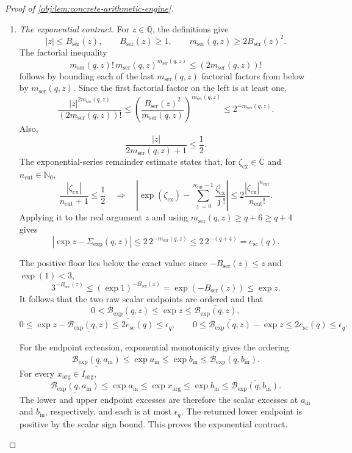 \begin{proof}[Proof of \cref{obj:lem:concrete-arithmetic-engine}]
\begin{enumerate}
\item \emph{The exponential contract.}
For \(z\in\mathbb Q\), the definitions give
\[
|z|\le B_{\mathrm{ser}}(z),\qquad
B_{\mathrm{ser}}(z)\ge1,\qquad
m_{\mathrm{ser}}(q,z)\ge2B_{\mathrm{ser}}(z)^2.
\]
The factorial inequality
\[
m_{\mathrm{ser}}(q,z)!\,
m_{\mathrm{ser}}(q,z)^{m_{\mathrm{ser}}(q,z)}
 \le(2m_{\mathrm{ser}}(q,z))!
\]
follows by bounding each of the last
\(m_{\mathrm{ser}}(q,z)\) factorial factors from below by
\(m_{\mathrm{ser}}(q,z)\). Since the first factorial factor on the left is at least one,
\[
\frac{|z|^{2m_{\mathrm{ser}}(q,z)}}
     {(2m_{\mathrm{ser}}(q,z))!}
 \le
 \left(\frac{B_{\mathrm{ser}}(z)^2}{m_{\mathrm{ser}}(q,z)}\right)^{
       m_{\mathrm{ser}}(q,z)}
 \le2^{-m_{\mathrm{ser}}(q,z)}.
\]
Also,
\[
\frac{|z|}{2m_{\mathrm{ser}}(q,z)+1}\le\frac12.
\]
The exponential-series remainder estimate states that, for
\(\zeta_{\mathrm{cx}}\in\mathbb C\) and \(n_{\mathrm{cut}}\in\mathbb N_0\),
\[
\frac{|\zeta_{\mathrm{cx}}|}{n_{\mathrm{cut}}+1}\le\frac12
\quad\Longrightarrow\quad
\left|
 \exp(\zeta_{\mathrm{cx}})
 -\sum_{\jmath=0}^{n_{\mathrm{cut}}-1}
       \frac{\zeta_{\mathrm{cx}}^\jmath}{\jmath!}
\right|
 \le2\frac{|\zeta_{\mathrm{cx}}|^{n_{\mathrm{cut}}}}
               {n_{\mathrm{cut}}!}.
\]
Applying it to the real argument \(z\) and using
\(m_{\mathrm{ser}}(q,z)\ge q+6\ge q+4\) gives
\[
|\exp z-\Sigma_{\exp}(q,z)|
 \le2\,2^{-m_{\mathrm{ser}}(q,z)}
 \le2\,2^{-(q+4)}
 =e_{\mathrm{sc}}(q).
\]

The positive floor lies below the exact value: since
\(-B_{\mathrm{ser}}(z)\le z\) and \(\exp(1)<3\),
\[
3^{-B_{\mathrm{ser}}(z)}
 \le(\exp1)^{-B_{\mathrm{ser}}(z)}
 =\exp(-B_{\mathrm{ser}}(z))
 \le\exp z.
\]
It follows that the two raw scalar endpoints are ordered and that
\[
0<\underline{\mathcal B_{\exp}(q,z)}
 \le\exp z\le\overline{\mathcal B_{\exp}(q,z)},
\]
\[
0\le\exp z-\underline{\mathcal B_{\exp}(q,z)}
 \le2e_{\mathrm{sc}}(q)\le\epsilon_q,
\qquad
0\le\overline{\mathcal B_{\exp}(q,z)}-\exp z
 \le2e_{\mathrm{sc}}(q)\le\epsilon_q.
\]

For the endpoint extension, exponential monotonicity gives the ordering
\[
\underline{\mathcal B_{\exp}(q,a_{\mathrm{in}})}
 \le\exp a_{\mathrm{in}}
 \le\exp b_{\mathrm{in}}
 \le\overline{\mathcal B_{\exp}(q,b_{\mathrm{in}})}.
\]
For every \(x_{\mathrm{arg}}\in I_{\mathrm{arg}}\),
\[
\underline{\mathcal B_{\exp}(q,a_{\mathrm{in}})}
 \le\exp a_{\mathrm{in}}
 \le\exp x_{\mathrm{arg}}
 \le\exp b_{\mathrm{in}}
 \le\overline{\mathcal B_{\exp}(q,b_{\mathrm{in}})}.
\]
The lower and upper endpoint excesses are therefore the scalar excesses at
\(a_{\mathrm{in}}\) and \(b_{\mathrm{in}}\), respectively, and each is at most
\(\epsilon_q\). The returned lower endpoint is positive by the scalar sign bound. This proves the exponential contract.


\end{enumerate}
\end{proof}
